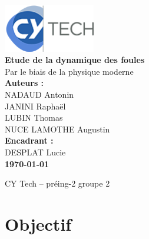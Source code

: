 \documentclass[a4paper,12pt]{article}
\begin{document}
\begin{titlepage}
	\centering
	\includegraphics[width=4cm]{logo.png} \\[1cm]  %

	{\LARGE \textbf{Etude de la dynamique des foules}} \\[0.5cm]
    
	{\large Par le biais de la physique moderne} \\[1.5cm]

	\textbf{Auteurs :} \\[0.3cm]
	NADAUD Antonin \\
	JANINI  Raphaël \\
	LUBIN Thomas \\
	NUCE LAMOTHE Augustin \\[1cm]

	\textbf{Encadrant :} \\[0.3cm]
	DESPLAT Lucie \\[1.5cm]

	\textbf{\today}  %
	\\[2cm]

	\vfill %

	{\large CY Tech – préing-2 groupe 2} \\

\end{titlepage}

\newpage
\thispagestyle{empty}  %
\mbox{}  %

\newpage


\renewcommand{\contentsname}{Sommaire}  %
\thispagestyle{empty}
\tableofcontents  %

\newpage

\setcounter{page}{1} %

\section{Objectif}
\end{document}
